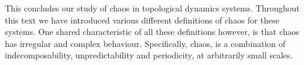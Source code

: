 This concludes our study of chaos in topological dynamics systems. Throughout this text we have introduced various different definitions of chaos for these systems. One shared characteristic of all these definitions however, is that chaos has irregular and complex behaviour. Specifically, chaos, is a combination of indecomposability, unpredictability and periodicity, at arbitrarily small scales.
